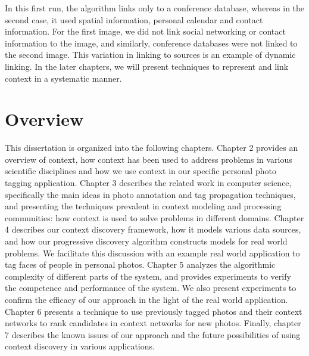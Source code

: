 In this first run, the algorithm links only to a conference database, whereas in the second case, it used spatial information, personal calendar and contact information. For the first image, we did not link social networking or contact information to the image, and similarly, conference databases were not linked to the second image. This variation in linking to sources is an example of dynamic linking. In the later chapters, we will present techniques to represent and link context in a systematic manner.

\section{Overview}
This dissertation is organized into the following chapters. Chapter 2 provides an overview of context, how context has been used to address problems in various scientific disciplines and how we use context in our specific personal photo tagging application. Chapter 3 describes the related work in computer science, specifically the main ideas in photo annotation and tag propagation techniques, and presenting the techniques prevalent in context modeling and processing communities: how context is used to solve problems in different domains. Chapter 4 describes our context discovery framework, how it models various data sources, and how our progressive discovery algorithm constructs models for real world problems. We facilitate this discussion with an example real world application to tag faces of people in personal photos. Chapter 5 analyzes the algorithmic complexity of different parts of the system, and provides experiments to verify the competence and performance of the system. We also present experiments to confirm the efficacy of our approach in the light of the real world application. Chapter 6 presents a technique to use previously tagged photos and their context networks to rank candidates in context networks for new photos. Finally, chapter 7 describes the known issues of our approach and the future possibilities of using context discovery in various applications.